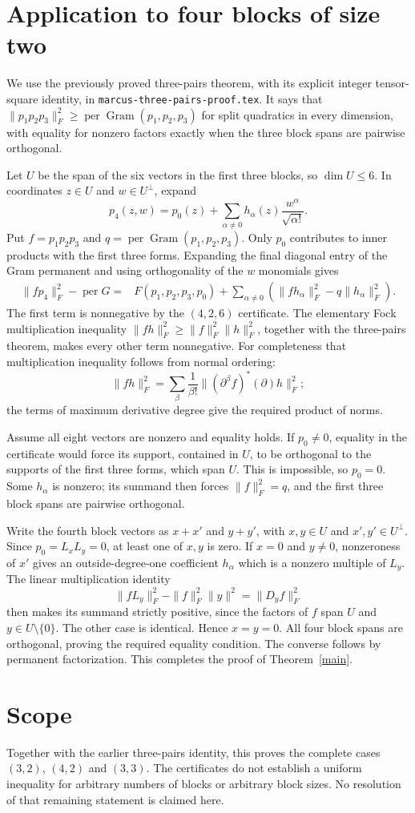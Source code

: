 \documentclass[11pt]{article}
\newcommand{\per}{\operatorname{per}}
\begin{document}
\section{Application to four blocks of size two}
We use the previously proved three-pairs theorem, with its explicit integer
tensor-square identity, in \texttt{marcus-three-pairs-proof.tex}.
It says that $\|p_1p_2p_3\|_F^2\geq\per\operatorname{Gram}(p_1,p_2,p_3)$
for split quadratics in every dimension, with equality for nonzero factors
exactly when the three block spans are pairwise orthogonal.

Let $U$ be the span of the six vectors in the first three blocks, so
$\dim U\leq6$. In coordinates $z\in U$ and $w\in U^\perp$, expand
\[
p_4(z,w)=p_0(z)+\sum_{\alpha\ne0}h_\alpha(z)
                    \frac{w^\alpha}{\sqrt{\alpha!}}.
\]
Put $f=p_1p_2p_3$ and $q=\per\operatorname{Gram}(p_1,p_2,p_3)$.
Only $p_0$ contributes to inner products with the first three forms. Expanding
the final diagonal entry of the Gram permanent and using orthogonality of
the $w$ monomials gives
\begin{align*}
\|fp_4\|_F^2-\per G
={}&F(p_1,p_2,p_3,p_0)
 +\sum_{\alpha\ne0}(\|fh_\alpha\|_F^2-q\|h_\alpha\|_F^2).
\end{align*}
The first term is nonnegative by the $(4,2,6)$ certificate. The elementary
Fock multiplication inequality $\|fh\|_F^2\geq\|f\|_F^2\|h\|_F^2$,
together with the three-pairs theorem, makes every other term nonnegative.
For completeness that multiplication inequality follows from normal ordering:
\[
\|fh\|_F^2=\sum_\beta\frac1{\beta!}
\| (\partial^\beta f)^*(\partial)h\|_F^2;
\]
the terms of maximum derivative degree give the required product of norms.

Assume all eight vectors are nonzero and equality holds. If $p_0\ne0$,
equality in the certificate would force its support, contained in $U$, to be
orthogonal to the supports of the first three forms, which span $U$.
This is impossible, so $p_0=0$. Some $h_\alpha$ is nonzero; its summand then
forces $\|f\|_F^2=q$, and the first three block spans are pairwise orthogonal.

Write the fourth block vectors as $x+x'$ and $y+y'$, with $x,y\in U$ and
$x',y'\in U^\perp$. Since $p_0=L_xL_y=0$, at least one of $x,y$ is zero.
If $x=0$ and $y\ne0$, nonzeroness of $x'$ gives an outside-degree-one
coefficient $h_\alpha$ which is a nonzero multiple of $L_y$.
The linear multiplication identity
\[
\|fL_y\|_F^2-\|f\|_F^2\|y\|^2=\|D_y f\|_F^2
\]
then makes its summand strictly positive, since the factors of $f$ span $U$
and $y\in U\setminus\{0\}$. The other case is identical. Hence $x=y=0$.
All four block spans are orthogonal, proving the required equality condition.
The converse follows by permanent factorization. This completes the proof
of Theorem~\ref{main}.

\section{Scope}
Together with the earlier three-pairs identity, this proves the complete
cases $(3,2)$, $(4,2)$ and $(3,3)$. The certificates do not establish a
uniform inequality for arbitrary numbers of blocks or arbitrary block sizes.
No resolution of that remaining statement is claimed here.
\end{document}
